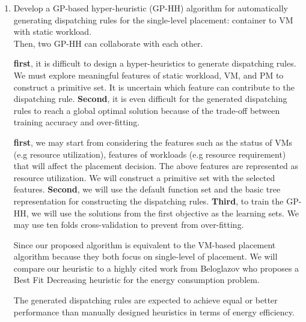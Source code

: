 \begin{enumerate}

	\item Develop a GP-based hyper-heuristic (GP-HH) algorithm for automatically generating dispatching rules for the single-level placement: container to VM with static workload. \\
	 Then, two GP-HH can collaborate with each other.

	 \textbf{first}, it is difficult to design a hyper-heuristics to generate dispatching rules. We must explore meaningful features of static workload, VM, and PM to construct a primitive set. It is uncertain which feature can contribute to the dispatching rule.  \textbf{Second}, it is even difficult for the generated dispatching rules to reach a global optimal solution because of the trade-off between training accuracy and over-fitting.

	 \textbf{first}, we may start from considering the features such as the status of VMs (e.g resource utilization), features of workloads (e.g resource requirement) that will affect the placement decision. The above features are represented as resource utilization. We will construct a primitive set with the selected features. 
	\textbf{Second}, we will use the default function set and the basic tree representation for constructing the dispatching rules. 
	\textbf{Third}, to train the GP-HH, we will use the solutions from the first objective as the learning sets. We may use ten folds cross-validation to prevent from over-fitting. 

	 Since our proposed algorithm is equivalent to the VM-based placement algorithm because they both focus on single-level of placement. We will compare our heuristic to a highly cited work \cite{Beloglazov:2012ji} from Beloglazov who proposes a Best Fit Decreasing heuristic for the energy consumption problem.

	 The generated dispatching rules are expected to achieve equal or better performance than manually designed heuristics in terms of energy efficiency. 


\end{enumerate}
